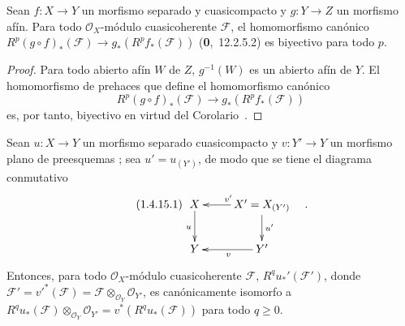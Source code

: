 \begin{proposition}[1.4.14]
\label{III.1.4.14}
\label{III.1.4.14-fr}
Sean $f:X\to Y$ un morfismo separado y cuasicompacto y $g:Y\to Z$ un morfismo afín.
Para todo $\mathcal O_X$-módulo cuasicoherente $\mathcal F$, el homomorfismo canónico $R^p(g\circ f)_*(\mathcal F)\to g_*(R^pf_*(\mathcal F))$ \textup{(\textbf{0},~12.2.5.2)} es biyectivo para todo $p$.
\end{proposition}

\begin{proof}
Para todo abierto afín $W$ de $Z$, $g^{-1}(W)$ es un abierto afín de $Y$.
El homomorfismo de prehaces que define el homomorfismo canónico
\[
R^p(g\circ f)_*(\mathcal F)\longrightarrow g_*(R^pf_*(\mathcal F))
\]
 es, por tanto, biyectivo en virtud del Corolario~.
\end{proof}

\begin{proposition}[1.4.15]
\label{III.1.4.15}
\label{III.1.4.15-fr}
Sean $u:X\to Y$ un morfismo separado cuasicompacto y $v:Y'\to Y$ un morfismo plano de preesquemas \textup{}; sea $u'=u_{(Y')}$, de modo que se tiene el diagrama conmutativo
\begin{equation}
\label{III.1.4.15.1-fr}
\tag{1.4.15.1}
\xymatrix{
X\ar[d]_u & X'=X_{(Y')}\ar[l]_{v'}\ar[d]^{u'}\\
Y & Y'\ar[l]^v
}\quad.
\end{equation}
Entonces, para todo $\mathcal O_X$-módulo cuasicoherente $\mathcal F$, $R^qu_*'(\mathcal F')$, donde
$\mathcal F'=v'^*(\mathcal F)=\mathcal F\otimes_{\mathcal O_Y}\mathcal O_{Y'}$,
es canónicamente isomorfo a
$R^qu_*(\mathcal F)\otimes_{\mathcal O_Y}\mathcal O_{Y'}
=v^*(R^qu_*(\mathcal F))$ para todo $q\geq0$.
\end{proposition}


